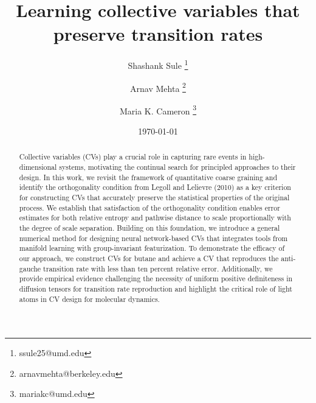 \documentclass[reqno, 12pt]{article}
\title{Learning collective variables that preserve transition rates}
\author[1]{Shashank Sule \thanks{ssule25@umd.edu}}
\author[2]{Arnav Mehta \thanks{arnavmehta@berkeley.edu}}
\author[1]{Maria K. Cameron \thanks{mariakc@umd.edu}}
\affil[1]{\small{Department of Mathematics, University of Maryland, College Park, MD, USA}}
\affil[2]{\small{Department of Mathematics, University of California, Berkeley, CA, USA}}
\date{\today}
\begin{document}
\maketitle
\begin{abstract}
    Collective variables (CVs) play a crucial role in capturing rare events in high-dimensional systems, motivating the continual search for principled approaches to their design. In this work, we revisit the framework of quantitative coarse graining and identify the orthogonality condition from Legoll and Lelievre (2010) as a key criterion for constructing CVs that accurately preserve the statistical properties of the original process. We establish that satisfaction of the orthogonality condition enables error estimates for both relative entropy and pathwise distance to scale proportionally with the degree of scale separation. Building on this foundation, we introduce a general numerical method for designing neural network-based CVs that integrates tools from manifold learning with group-invariant featurization. To demonstrate the efficacy of our approach, we construct CVs for butane and achieve a CV that reproduces the anti-gauche transition rate with less than ten percent relative error. Additionally, we provide empirical evidence challenging the necessity of uniform positive definiteness in diffusion tensors for transition rate reproduction and highlight the critical role of light atoms in CV design for molecular dynamics. 
\end{abstract}
\end{document}
